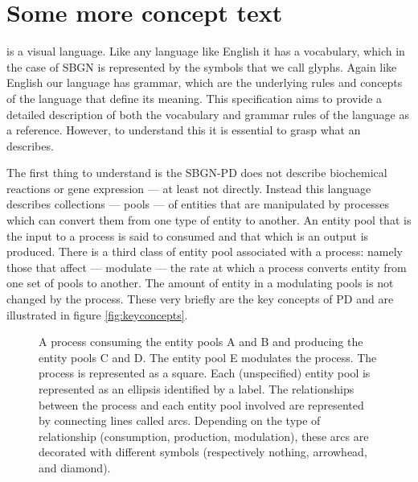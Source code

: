 \section{Some more concept text}

\SBGNPDLone is a visual language. Like any language like English it has a vocabulary, which in the case of SBGN is represented by the symbols that we call glyphs. Again like English our language has grammar, which are the underlying rules and concepts of the language that define its meaning. This specification aims to provide a detailed description of both the vocabulary and grammar rules of the language as a reference. However, to understand this it is essential to grasp what an \PDm describes.

The first thing to understand is the SBGN-PD does not describe biochemical reactions or gene expression --- at least not directly. Instead this language describes collections --- pools --- of entities that are manipulated by processes which can convert them from one type of entity to another. An entity pool that is the input to a process is said to consumed and that which is an output is produced. There is a third class of entity pool associated with a process: namely those that affect --- modulate --- the rate at which a process converts entity from one set of pools to another. The amount of entity in a modulating pools is not changed by the process. These very briefly are the key concepts of PD and are illustrated in figure \ref{fig:keyconcepts}.

\begin{figure}[htb]
\begin{center}
\caption{A process consuming the entity pools A and B and producing the entity pools C and D. The entity pool E modulates the process. The process is represented as a square. Each (unspecified) entity pool is represented as an ellipsis identified by a label. The relationships between the process and each entity pool involved are represented by connecting lines called arcs. Depending on the type of relationship (consumption, production, modulation), these arcs are decorated with different symbols (respectively nothing, arrowhead, and diamond).}\label{fig:key concepts}
\end{center}
\end{figure}

